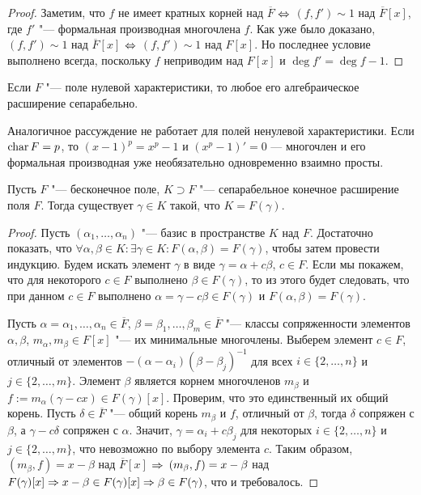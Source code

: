 \begin{proof}
	Заметим, что $f$ не имеет кратных корней над $\overline{F}$ $\Leftrightarrow$ $(f, f') \sim 1$ над $\overline{F}[x]$, где $f'$ "--- формальная производная многочлена $f$. Как уже было доказано, $(f, f') \sim 1$ над $\overline{F}[x]$ $\Leftrightarrow$ $(f, f') \sim 1$ над $F[x]$. Но последнее условие выполнено всегда, поскольку $f$ неприводим над $F[x]$ и $\deg{f'} = \deg{f} - 1$.
\end{proof}

\begin{corollary}
	 Если $F$ "--- поле нулевой характеристики, то любое его алгебраическое расширение сепарабельно.
\end{corollary}

\begin{note}
	Аналогичное рассуждение не работает для полей ненулевой характеристики. Если $\operatorname{char}{F} = p$, то $(x - 1)^p = x^p - 1$ и $(x^p - 1)' = 0$ --- многочлен и его формальная производная уже необязательно одновременно взаимно просты.
\end{note}

\begin{theorem}
	Пусть $F$ "--- бесконечное поле, $K \supset F$ "--- сепарабельное конечное расширение поля $F$. Тогда существует $\gamma \in K$ такой, что $K = F(\gamma)$.
\end{theorem}

\begin{proof}
	Пусть $(\alpha_1, \dotsc, \alpha_n)$ "--- базис в пространстве $K$ над $F$. Достаточно показать, что $\forall \alpha, \beta \in K: \exists \gamma \in K: F(\alpha, \beta) = F(\gamma)$, чтобы затем провести индукцию. Будем искать элемент $\gamma$ в виде $\gamma = \alpha +c\beta$, $c \in F$. Если мы покажем, что для некоторого $c \in F$ выполнено $\beta \in F(\gamma)$, то из этого будет следовать, что при данном $c \in F$ выполнено $\alpha = \gamma - c\beta \in F(\gamma)$ и $F(\alpha, \beta) = F(\gamma)$.
	
	Пусть $\alpha = \alpha_1, \dotsc, \alpha_n \in \overline{F}$, $\beta = \beta_1, \dotsc, \beta_m \in \overline{F}$ "--- классы сопряженности элементов $\alpha, \beta$, $m_\alpha, m_\beta \in F[x]$ "--- их минимальные многочлены. Выберем элемент $c \in F$, отличный от элементов $-(\alpha - \alpha_i)(\beta - \beta_j)^{-1}$ для всех $i \in \{2, \dotsc, n\}$ и $j \in \{2, \dotsc, m\}$. Элемент $\beta$ является корнем многочленов $m_\beta$ и $f := m_\alpha(\gamma - cx) \in F(\gamma)[x]$. Проверим, что это единственный их общий корень. Пусть $\delta \in \overline{F}$ "--- общий корень $m_\beta$ и $f$, отличный от $\beta$, тогда $\delta$ сопряжен с $\beta$, а $\gamma - c\delta$ сопряжен с $\alpha$. Значит, $\gamma = \alpha_i + c\beta_j$ для некоторых $i \in \{2, \dotsc, n\}$ и $j \in \{2, \dotsc, m\}$, что невозможно по выбору элемента $c$. Таким образом, $(m_\beta, f) = x - \beta$ над $\overline{F}[x]$ $\Rightarrow$ $(m_\beta, f) \hm= x - \beta$ над $F(\gamma)[x] \Rightarrow x - \beta \in F(\gamma)[x] \Rightarrow \beta \in F(\gamma)$, что и требовалось.
\end{proof}

